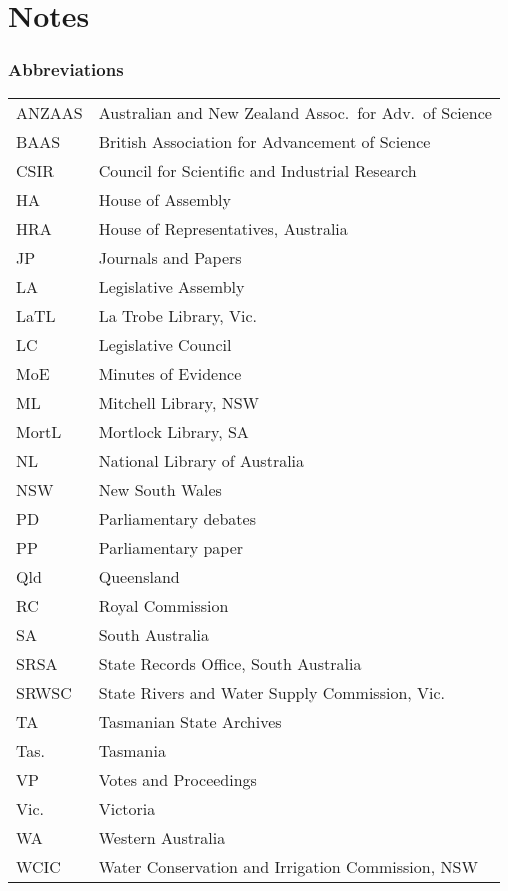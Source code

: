 
\chapter{Notes}
\label{ch:notes}


\small

\subsection*{Abbreviations} 

\begin{tabular}{ll}
	ANZAAS	& Australian and New Zealand Assoc.\ for Adv.\ of
                              Science\\
       	BAAS	& British Association for Advancement of Science\\
	CSIR    & Council for Scientific and Industrial Research\\
        HA      & House of Assembly\\
	HRA	& House of Representatives, Australia\\
	JP      & Journals and Papers\\
        LA      & Legislative Assembly\\
	LaTL	& La Trobe Library, Vic.\\
        LC      & Legislative Council\\
	MoE	& Minutes of Evidence\\
	ML	& Mitchell Library, NSW\\
	MortL	& Mortlock Library, SA\\
	NL      & National Library of Australia\\
	NSW	& New South Wales\\
	PD	& Parliamentary debates\\
	PP	& Parliamentary paper\\
	Qld	& Queensland\\
	RC	& Royal Commission\\
	SA	& South Australia\\
	SRSA	& State Records Office, South Australia\\
	SRWSC   & State Rivers and Water Supply Commission, Vic.\\
	TA	& Tasmanian State Archives\\
	Tas.	& Tasmania\\
	VP	& Votes and Proceedings\\
	Vic.	& Victoria\\
	WA	& Western Australia\\
	WCIC    & Water Conservation and Irrigation Commission, NSW
\end{tabular}

